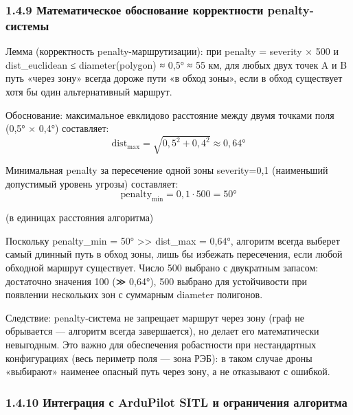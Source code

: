 \documentclass[14pt,a4paper]{extarticle}
\begin{document}
\hypertarget{ux43cux430ux442ux435ux43cux430ux442ux438ux447ux435ux441ux43aux43eux435-ux43eux431ux43eux441ux43dux43eux432ux430ux43dux438ux435-ux43aux43eux440ux440ux435ux43aux442ux43dux43eux441ux442ux438-penalty-ux441ux438ux441ux442ux435ux43cux44b}{%
\subsubsection{1.4.9 Математическое обоснование корректности penalty-системы}\label{ux43cux430ux442ux435ux43cux430ux442ux438ux447ux435ux441ux43aux43eux435-ux43eux431ux43eux441ux43dux43eux432ux430ux43dux438ux435-ux43aux43eux440ux440ux435ux43aux442ux43dux43eux441ux442ux438-penalty-ux441ux438ux441ux442ux435ux43cux44b}}

Лемма (корректность penalty-маршрутизации): при penalty = severity × 500 и dist\_euclidean ≤ diameter(polygon) ≈ 0,5° ≈ 55 км, для любых двух точек A и B путь «через зону» всегда дороже пути «в обход зоны», если в обход существует хотя бы один альтернативный маршрут.

Обоснование: максимальное евклидово расстояние между двумя точками поля (0,5° × 0,4°) составляет: \[\mathrm{dist}_{\max} = \sqrt{0{,}5^2 + 0{,}4^2} \approx 0{,}64°\]

Минимальная penalty за пересечение одной зоны severity=0,1 (наименьший допустимый уровень угрозы) составляет: \[\mathrm{penalty}_{\min} = 0{,}1 \cdot 500 = 50°\]

(в единицах расстояния алгоритма)

Поскольку penalty\_min = 50° \textgreater\textgreater{} dist\_max = 0,64°, алгоритм всегда выберет самый длинный путь в обход зоны, лишь бы избежать пересечения, если любой обходной маршрут существует. Число 500 выбрано с двукратным запасом: достаточно значения 100 (≫ 0,64°), 500 выбрано для устойчивости при появлении нескольких зон с суммарным diameter полигонов.

Следствие: penalty-система не запрещает маршрут через зону (граф не обрывается --- алгоритм всегда завершается), но делает его математически невыгодным. Это важно для обеспечения робастности при нестандартных конфигурациях (весь периметр поля --- зона РЭБ): в таком случае дроны «выбирают» наименее опасный путь через зону, а не отказывают с ошибкой.

\hypertarget{ux438ux43dux442ux435ux433ux440ux430ux446ux438ux44f-ux441-ardupilot-sitl-ux438-ux43eux433ux440ux430ux43dux438ux447ux435ux43dux438ux44f-ux430ux43bux433ux43eux440ux438ux442ux43cux430}{%
\subsubsection{1.4.10 Интеграция с ArduPilot SITL и ограничения алгоритма}\label{ux438ux43dux442ux435ux433ux440ux430ux446ux438ux44f-ux441-ardupilot-sitl-ux438-ux43eux433ux440ux430ux43dux438ux447ux435ux43dux438ux44f-ux430ux43bux433ux43eux440ux438ux442ux43cux430}}
\end{document}
